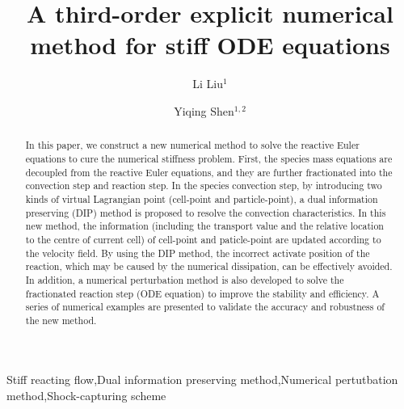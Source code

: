 \documentclass[review]{elsarticle}
\theoremstyle{plain}\newtheorem{definition}{\sc{Definition}}
\theoremstyle{defination}\newtheorem{example}{Example}[section]
\numberwithin{equation}{section}
\numberwithin{table}{section}
\begin{document}
\title{A third-order explicit numerical method for stiff ODE equations}
\author{Li Liu$^1$}
\author{Yiqing Shen$^{1,2}$ }
\address{$^1$LHD, Institute of Mechanics, Chinese Academy of Sciences, Beijing 100190, China}
\address{$^2$School of Engineering Science, University of Chinese Academy of Sciences, Beijing 100049, China}
{
\begin{abstract}
In this paper, we construct a new numerical method to solve the reactive Euler equations to cure the numerical stiffness problem.
First, the species mass equations are decoupled from the reactive Euler equations, and they are further fractionated into the convection step and reaction step.
 In the species convection
step, by introducing two kinds of virtual Lagrangian point (cell-point and particle-point), a dual information preserving (DIP) method is proposed to resolve the convection characteristics. In this new method, the 
 information (including the transport value and the relative location to the centre of current cell) of cell-point and paticle-point are updated according to the velocity field. By using the DIP method, the incorrect activate position of the reaction, which may be caused by the numerical dissipation, can be effectively avoided. In addition, a numerical perturbation method is also developed to solve the fractionated reaction step (ODE equation) to improve the stability and efficiency. A series of numerical examples are presented to validate the accuracy and robustness of the new method. 
\end{abstract}
\begin{keyword}
 Stiff reacting flow\sep  Dual information preserving method\sep Numerical pertutbation method\sep Shock-capturing scheme 
\end{keyword}

\maketitle
}
\end{document}

